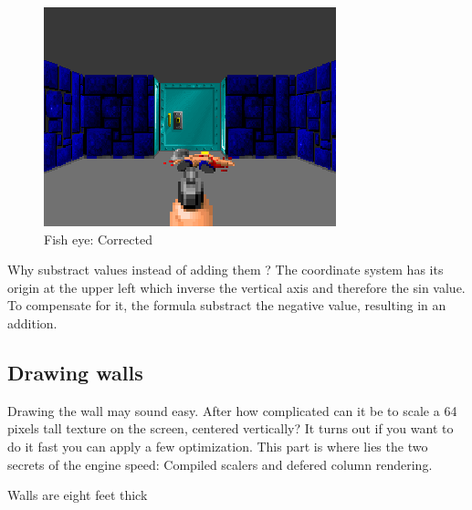   \begin{figure}[H]
\centering
 \includegraphics[width=\textwidth]{screenshots/wolf3d_7_fullframe.png}
  \caption{Fish eye: Corrected} 
 \end{figure}
 \par
  Why substract values instead of adding them ? The coordinate system has its origin at the upper left which inverse the vertical axis and therefore the sin value. To compensate for it, the formula substract the negative value, resulting in an addition.













\subsection{Drawing walls}
Drawing the wall may sound easy. After how complicated can it be to scale a 64 pixels tall texture on the screen, centered vertically? It turns out if you want to do it fast you can apply a few optimization. This part is where lies the two secrets of the engine speed: Compiled scalers and defered column rendering.\\
\par
Walls are eight feet thick
\par

